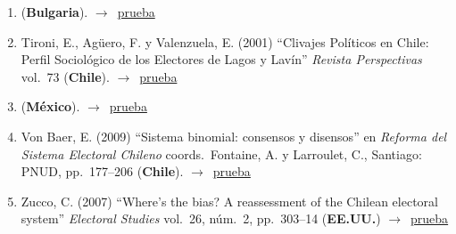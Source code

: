 \documentclass[12 pt, letter]{article}
\newenvironment{CitasMiTrabajo}{
    \begin{footnotesize}
    \begin{enumerate}[label={\footnotesize\emph{cita~\arabic*}},ref=\arabic*] %
        \setlength{\itemsep}{.1\itemsep}
        \setlength{\parskip}{.1\parskip}
    }{\end{enumerate}\end{footnotesize}}
\begin{document}
\begin{CitasMiTrabajo}
        \item {} (\textbf{Bulgaria}). $\rightarrow$~\href{http://ijpam.eu/contents/2008-47-4/3/3.pdf}{prueba}
        
        \item Tironi, E., Ag\"uero, F. y Valenzuela, E. (2001)
        ``Clivajes Pol\'iticos en Chile: Perfil Sociol\'ogico de los Electores de Lagos y Lav\'in''
        \emph{Revista Perspectivas} vol.\ 73 (\textbf{Chile}). $\rightarrow$~\href{https://github.com/emagar/cv/blob/master/citasMiTrab/mrs/tironietal2001.pdf}{prueba}

        \item {} (\textbf{M\'exico}). $\rightarrow$~\href{http://www.scielo.org.mx/scielo.php?pid=S1665-20372011000200005&script=sci_arttext}{prueba}
        
        \item Von Baer, E. (2009)
        ``Sistema binomial: consensos y disensos'' en
        \emph{Reforma del Sistema Electoral Chileno} coords.\ Fontaine, A. y Larroulet, C., Santiago: PNUD, pp.\ 177--206 (\textbf{Chile}). $\rightarrow$~\href{https://github.com/emagar/cv/blob/master/citasMiTrab/mrs/vonBaer2009.pdf}{prueba}

        \item Zucco, C. (2007)
        ``Where's the bias? A reassessment of the Chilean electoral system'' \emph{Electoral Studies} vol.\ 26, n\'um.\ 2,
        pp.\ 303--14  (\textbf{EE.UU.}) $\rightarrow$~\href{https://github.com/emagar/cv/blob/master/citasMiTrab/mrs/zucco.pdf}{prueba}

        \label{ncites:magar.etal.1998} %



\end{CitasMiTrabajo}
\end{document}
